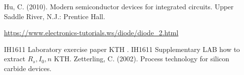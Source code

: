 \documentclass[letterpaper,12pt]{article}
\begin{document}
\begin{thebibliography}{99}

Hu, C. (2010). Modern semiconductor devices for integrated circuits. Upper Saddle River, N.J.: Prentice Hall.

\url{https://www.electronics-tutorials.ws/diode/diode_2.html}

IH1611 Laboratory exercise paper KTH .
IH1611 Supplementary LAB how to extract $R_s,I_0,n$ KTH.
Zetterling, C. (2002). Process technology for silicon carbide devices.
\end{thebibliography}
\end{document}
